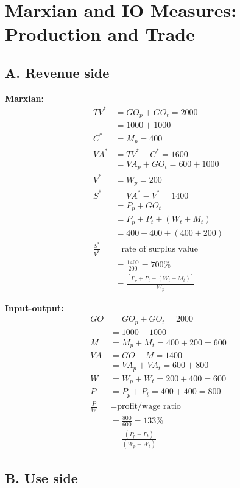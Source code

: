 
\section*{Marxian and IO Measures: Production and Trade}

\subsection*{A. Revenue side}

\textbf{Marxian:}
\begin{align*}
TV^* &= GO_p + GO_t = 2000 \\
&= 1000 + 1000 \\
C^* &= M_p = 400 \\
VA^* &= TV^* - C^* = 1600 \\
&= VA_p + GO_t = 600 + 1000 \\
V^* &= W_p = 200 \\
S^* &= VA^* - V^* = 1400 \\
&= P_p + GO_t \\
&= P_p + P_t + (W_t + M_t) \\
&= 400 + 400 + (400 + 200) \\
\frac{S^*}{V^*} &= \text{rate of surplus value} \\
&= \frac{1400}{200} = 700\% \\
&= \frac{[P_p + P_t + (W_t + M_t)]}{W_p}
\end{align*}

\textbf{Input-output:}
\begin{align*}
GO &= GO_p + GO_t = 2000 \\
&= 1000 + 1000 \\
M &= M_p + M_t = 400 + 200 = 600 \\
VA &= GO - M = 1400 \\
&= VA_p + VA_t = 600 + 800 \\
W &= W_p + W_t = 200 + 400 = 600 \\
P &= P_p + P_t = 400 + 400 = 800 \\
\frac{P}{W} &= \text{profit/wage ratio} \\
&= \frac{800}{600} = 133\% \\
&= \frac{(P_p + P_t)}{(W_p + W_t)}
\end{align*}

\subsection*{B. Use side}


